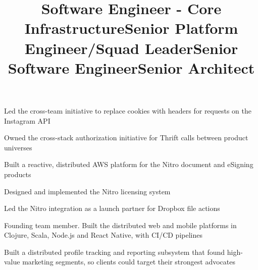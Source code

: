 \documentclass[margin,line]{resume}
\newenvironment{bullet-list}{
  \begin{list}{$\bullet$}{%
      \setlength{\itemsep}{0in}
      \setlength{\parsep}{0in} \setlength{\parskip}{0in}
      \setlength{\topsep}{0in} \setlength{\partopsep}{0in}
      \setlength{\leftmargin}{0.2in}}}{\end{list}}
\begin{document}
\begin{resume}
\title{Software Engineer - Core Infrastructure}
\begin{position}
\vspace{-.3cm}
\begin{bullet-list}
\item Led the cross-team initiative to replace cookies with headers for requests on the Instagram API
\item Owned the cross-stack authorization initiative for Thrift calls between product universes
\end{bullet-list}
\end{position}

\title{Senior Platform Engineer/Squad Leader}
\begin{position}
\vspace{-.3cm}
\begin{bullet-list}
\item Built a reactive, distributed AWS platform for the Nitro document and eSigning products
\item Designed and implemented the Nitro licensing system
\item Led the Nitro integration as a launch partner for Dropbox file actions
\end{bullet-list}
\end{position}

\title{Senior Software Engineer}
\begin{position}
\vspace{-.3cm}
\begin{bullet-list}
\item Founding team member. Built the distributed web and mobile platforms in Clojure, Scala, Node.js and React Native, with CI/CD pipelines
\end{bullet-list}
\end{position}

\title{Senior Architect}
\begin{position}
\vspace{-.3cm}
\begin{bullet-list}
\item Built a distributed profile tracking and reporting subsystem that found high-value marketing segments, so clients could target their strongest advocates
\end{bullet-list}
\end{position}


\end{resume}
\end{document}
